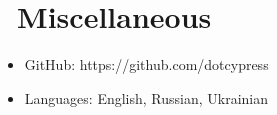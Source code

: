 \documentclass{resume}
\begin{document}
\section{\faInfo\ Miscellaneous}
\begin{itemize}[parsep=0.5ex]
  \item GitHub: https://github.com/dotcypress
  \item Languages: English, Russian, Ukrainian
\end{itemize}

%
%
\end{document}
